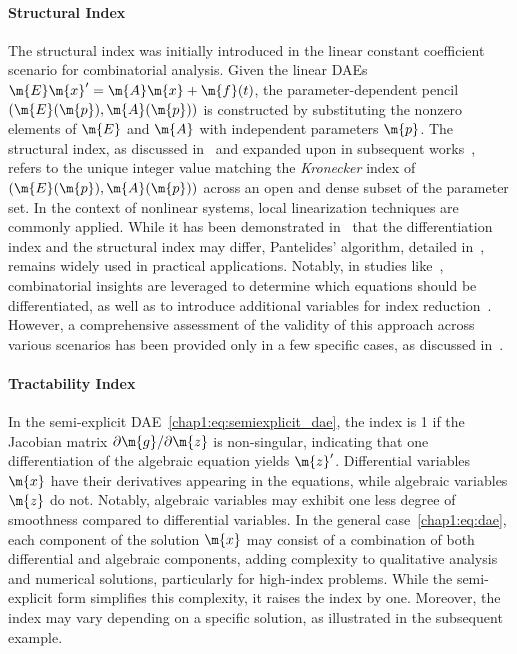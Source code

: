 \paragraph{Structural Index}

The structural index was initially introduced in the linear constant coefficient scenario for combinatorial analysis. Given the linear \acp{DAE} $\m{E}\m{x}^{\prime} = \m{A}\m{x} + \m{f}(t)$, the parameter-dependent pencil $(\m{E}(\m{p}), \m{A}(\m{p}))$ is constructed by substituting the nonzero elements of $\m{E}$ and $\m{A}$ with independent parameters $\m{p}$. The structural index, as discussed in~\cite{pantelides1988consistent, pryce2001simple} and expanded upon in subsequent works~\cite{benveniste2021structural}, refers to the unique integer value matching the \emph{Kronecker} index of $(\m{E}(\m{p}), \m{A}(\m{p}))$ across an open and dense subset of the parameter set. In the context of nonlinear systems, local linearization techniques are commonly applied. While it has been demonstrated in~\cite{reissig2000differential} that the differentiation index and the structural index may differ, Pantelides' algorithm, detailed in~\cite{pantelides1988consistent}, remains widely used in practical applications. Notably, in studies like~\cite{unger1995structural}, combinatorial insights are leveraged to determine which equations should be differentiated, as well as to introduce additional variables for index reduction~\cite{mattsson1993index}. However, a comprehensive assessment of the validity of this approach across various scenarios has been provided only in a few specific cases, as discussed in~\cite{mehrmann2015index}.

\paragraph{Tractability Index}

In the semi-explicit \ac{DAE}~\eqref{chap1:eq:semiexplicit_dae}, the index is 1 if the Jacobian matrix $\partial\m{g}/\partial\m{z}$ is non-singular, indicating that one differentiation of the algebraic equation yields $\m{z}^{\prime}$. Differential variables $\m{x}$ have their derivatives appearing in the equations, while algebraic variables $\m{z}$ do not. Notably, algebraic variables may exhibit one less degree of smoothness compared to differential variables. In the general case~\eqref{chap1:eq:dae}, each component of the solution $\m{x}$ may consist of a combination of both differential and algebraic components, adding complexity to qualitative analysis and numerical solutions, particularly for high-index problems. While the semi-explicit form simplifies this complexity, it raises the index by one. Moreover, the index may vary depending on a specific solution, as illustrated in the subsequent example.

